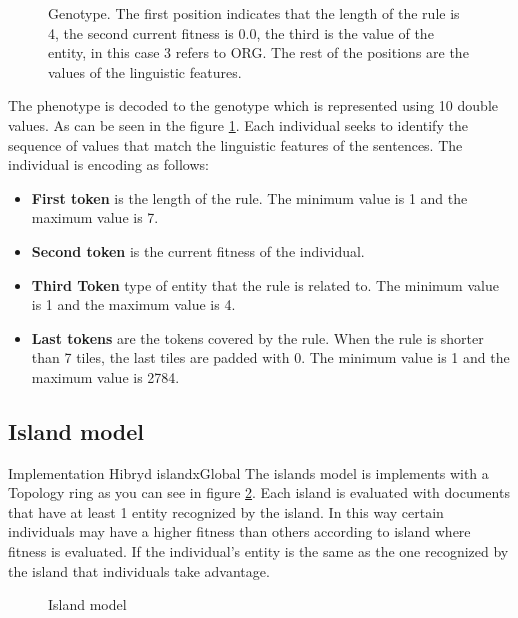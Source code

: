 \begin{figure}[ht]
  \centering
  
  \caption{Genotype. The first position indicates that the length of the rule is 4, the second current fitness is 0.0, the third is the value of the entity, in this case 3 refers to ORG. The rest of the positions are the values of the linguistic features.}

  \label{fig:genotype}
\end{figure}

The phenotype is decoded to the genotype which is represented using 10 double values. As can be seen in the figure \ref{fig:genotype}. Each individual seeks to identify the sequence of values that match the linguistic features of the sentences. The individual is encoding as follows:

\begin{itemize}
  \item \textbf{First token} is the length of the rule. The minimum value is 1 and the maximum value is 7.
  \item \textbf{Second token} is the current fitness of the individual.
  \item \textbf{Third Token} type of entity that the rule is related to. The minimum value is 1 and the maximum value is 4.
  \item \textbf{Last tokens} are the tokens covered by the rule. When the rule is shorter than 7 tiles, the last tiles are padded with 0. The minimum value is 1 and the maximum value is 2784.
\end{itemize}

\subsection{Island model}

Implementation Hibryd islandxGlobal
The islands model is implements with a Topology ring as you can see in figure \ref{fig:island}. Each island is evaluated with documents that have at least 1 entity recognized by the island. In this way certain individuals may have a higher fitness than others according to island where fitness is evaluated. If the individual's entity is the same as the one recognized by the island that individuals take advantage.

\begin{figure}[ht]
  \centering
  
  \caption{Island model}
  \label{fig:island}
\end{figure}

